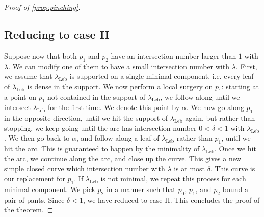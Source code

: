 \documentclass[12pt, reqno]{amsart}
\begin{document}
\begin{proof}[Proof of \autoref{prop:pinching}]
\subsection*{Reducing to case II} Suppose now that both $p_1$ and $p_2$ have an intersection number larger than $1$ with $\lambda$.
We can modify one of them to have a small intersection number with $\lambda$.
First, we assume that $\lambda_{\mathrm{Leb}}$ is supported on a single minimal component, i.e. every leaf of $\lambda_{\mathrm{Leb}}$ is dense in the support.
We now perform a local surgery on $p_1$: starting at a point on $p_1$ not contained in the support of $\lambda_{\mathrm{Leb}}$, we follow along until we intersect $\lambda_{\mathrm{Leb}}$ for the first time.
We denote this point by $\alpha$.
We now go along $p_1$ in the opposite direction, until we hit the support of $\lambda_{\mathrm{Leb}}$ again, but rather than stopping, we keep going until the arc has intersection number $0 < \delta < 1$ with $\lambda_{\mathrm{Leb}}$.
We then go back to $\alpha$, and follow along a leaf of $\lambda_{\mathrm{Leb}}$ rather than $p_1$, until we hit the arc.
This is guaranteed to happen by the minimality of $\lambda_{\mathrm{Leb}}$.
Once we hit the arc, we continue along the arc, and close up the curve.
This gives a new simple closed curve which intersection number with $\lambda$ is at most $\delta$.
This curve is our replacement for $p_1$.
If $\lambda_{\mathrm{Leb}}$ is not minimal, we repeat this process for each minimal component. We pick $p_2$ in a manner such that $p_0$, $p_1$, and $p_2$ bound a pair of pants.
Since $\delta < 1$, we have reduced to case II.
This concludes the proof of the theorem.
\end{proof}
\end{document}
